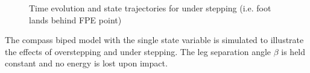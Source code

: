 \begin{figure}[!h]
	\begin{center}
	\end{center}
  	\caption{Time evolution and state trajectories for under stepping (i.e. foot lands behind FPE point)}
	\label{sim:under}
\end{figure}

The compass biped model with the single state variable is simulated to illustrate the effects of overstepping and under stepping. The leg separation angle $\beta$ is held constant and no energy is lost upon impact.

